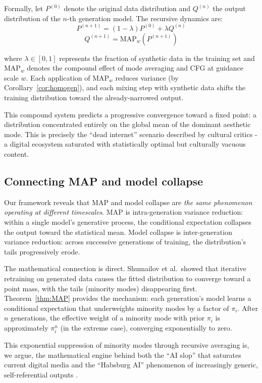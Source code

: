 \documentclass[11pt]{article}
\begin{document}
Formally, let $P^{(0)}$ denote the original data distribution and $Q^{(n)}$ the output distribution of the $n$-th generation model. The recursive dynamics are:
$$P^{(n+1)} = (1 - \lambda) P^{(0)} + \lambda Q^{(n)}$$
$$Q^{(n+1)} = \mathrm{MAP}_w(P^{(n+1)})$$

where $\lambda \in [0, 1]$ represents the fraction of synthetic data in the training set and $\mathrm{MAP}_w$ denotes the compound effect of mode averaging and CFG at guidance scale $w$. Each application of $\mathrm{MAP}_w$ reduces variance (by Corollary~\ref{cor:homogen}), and each mixing step with synthetic data shifts the training distribution toward the already-narrowed output.

This compound system predicts a progressive convergence toward a fixed point: a distribution concentrated entirely on the global mean of the dominant aesthetic mode. This is precisely the ``dead internet'' scenario described by cultural critics \citep{Tiffany2021} - a digital ecosystem saturated with statistically optimal but culturally vacuous content.

\subsection{Connecting MAP and model collapse}

Our framework reveals that MAP and model collapse are \textit{the same phenomenon operating at different timescales}. MAP is intra-generation variance reduction: within a single model's generative process, the conditional expectation collapses the output toward the statistical mean. Model collapse \citep{Shumailov2024} is inter-generation variance reduction: across successive generations of training, the distribution's tails progressively erode.

The mathematical connection is direct. Shumailov et al.\ showed that iterative retraining on generated data causes the fitted distribution to converge toward a point mass, with the tails (minority modes) disappearing first. Theorem~\ref{thm:MAP} provides the mechanism: each generation's model learns a conditional expectation that underweights minority modes by a factor of $\pi_i$. After $n$ generations, the effective weight of a minority mode with prior $\pi_i$ is approximately $\pi_i^n$ (in the extreme case), converging exponentially to zero.

This exponential suppression of minority modes through recursive averaging is, we argue, the mathematical engine behind both the ``AI slop'' that saturates current digital media and the ``Habsburg AI'' phenomenon of increasingly generic, self-referential outputs \citep{Sadowski2023, Skeete2025}.
\end{document}
